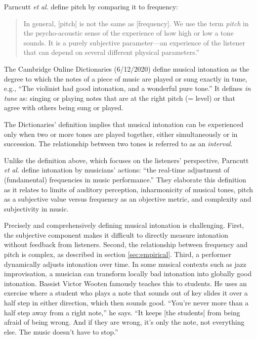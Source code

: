 Parncutt \textit{et al.} define pitch by comparing it to frequency: 
\begin{quotation}In general, [pitch] is not the same as [frequency]. We use the term \textit{pitch} in the psycho-acoustic sense of the experience of how high or low a tone sounds. It is a purely subjective parameter---an experience of the listener that can depend on several different physical parameters.'' \cite[][p.~477]{parncutt2018psychocultural}\end{quotation}

The Cambridge Online Dictionaries (6/12/2020) define musical intonation as the degree to which the notes of a piece of music are played or sung exactly in  tune,  e.g.,  ``The  violinist  had  good  intonation,  and a wonderful pure tone.'' It defines \textit{in tune} as: singing or playing notes that are at the right pitch (= level) or that agree with others being sung or played. 

The Dictionaries' definition implies that musical intonation can be experienced only when two or more tones are played together, either simultaneously or in succession. The relationship between two tones is referred to as an \textit{interval}.

Unlike the definition above, which focuses on the listeners' perspective, Parncutt \textit{et al.} define intonation by musicians' actions: ``the real-time adjustment of (fundamental) frequencies in music performance.'' \cite[p.~477]{parncutt2018psychocultural} They elaborate this definition as it relates to limits of auditory perception, inharmonicity of musical tones, pitch as a subjective value versus frequency as an objective metric, and complexity and subjectivity in music.

Precisely and comprehensively defining musical intonation is challenging. First, the subjective component makes it difficult to directly measure intonation without feedback from listeners. Second, the relationship between frequency and pitch is complex, as described in section \ref{sec:empirical}. Third, a performer dynamically adjusts intonation over time. In some musical contexts such as jazz improvisation, a musician can transform locally bad intonation into globally good intonation. Bassist Victor Wooten famously teaches this to students. He uses an exercise where a student who plays a note that sounds out of key slides it over a half step in either direction, which then sounds good. ``You’re never more than a half step away from a right note,'' he says. ``It keeps [the students] from being afraid of being wrong. And if they are wrong, it’s only the note, not everything else. The music doesn’t have to stop.'' \cite{Freddy2020}

